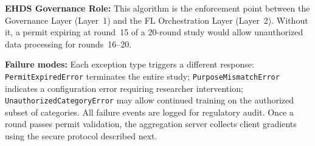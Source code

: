 \documentclass[conference,a4paper]{IEEEtran}
\begin{document}
\textbf{EHDS Governance Role:} This algorithm is the enforcement point between the Governance Layer (Layer~1) and the FL Orchestration Layer (Layer~2). Without it, a permit expiring at round~15 of a 20-round study would allow unauthorized data processing for rounds~16--20.

\begin{figure}[htbp]
\centering
{}
\end{figure}

\textbf{Failure modes:} Each exception type triggers a different response: \texttt{PermitExpiredError} terminates the entire study; \texttt{PurposeMismatchError} indicates a configuration error requiring researcher intervention; \texttt{UnauthorizedCategoryError} may allow continued training on the authorized subset of categories. All failure events are logged for regulatory audit. Once a round passes permit validation, the aggregation server collects client gradients using the secure protocol described next.
\end{document}
